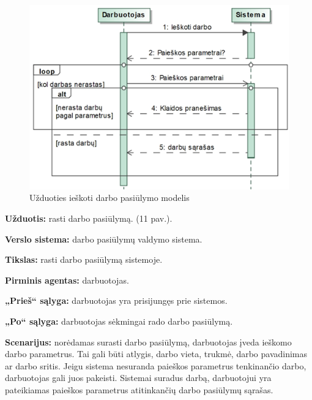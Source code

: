 \documentclass{VUMIFPSkursinis}
\begin{document}
\begin{figure}[H]
\centering
\includegraphics[scale=1]{img/ieskoti.png}
\caption{Užduoties ieškoti darbo pasiūlymo modelis}
\end{figure}

\textbf{Užduotis:} rasti darbo pasiūlymą. (11 pav.).

\textbf{Verslo sistema:} darbo pasiūlymų valdymo sistema.

\textbf{Tikslas:} rasti darbo pasiūlymą sistemoje.

\textbf{Pirminis agentas:} darbuotojas.

\textbf{„Prieš“ sąlyga:}  darbuotojas yra prisijungęs prie sistemos.

\textbf{„Po“ sąlyga:} darbuotojas sėkmingai rado darbo pasiūlymą.

\textbf{Scenarijus:} norėdamas surasti darbo pasiūlymą, darbuotojas įveda ieškomo darbo parametrus. Tai gali būti atlygis, darbo vieta, trukmė, darbo pavadinimas ar darbo sritis. Jeigu sistema nesuranda paieškos parametrus tenkinančio darbo, darbuotojas gali juos pakeisti. Sistemai suradus darbą, darbuotojui yra pateikiamas paieškos parametrus atitinkančių darbo pasiūlymų sąrašas. 
\end{document}

